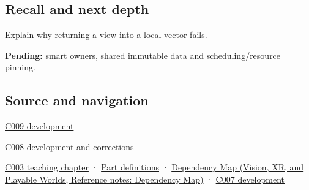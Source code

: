 \subsection{Recall and next depth}\label{appendix-d52e4486f527-recall-and-next-depth}

\hypertarget{appendix-d52e4486f527-recall-and-next-depth}{}

Explain why returning a view into a local vector fails.

\textbf{Pending:} smart owners, shared immutable data and scheduling/resource pinning.

\subsection{Source and navigation}\label{appendix-d52e4486f527-source-and-navigation}

\hypertarget{appendix-d52e4486f527-source-and-navigation}{}

\hyperref[appendix-fd090d982a15-m009---parts-127-147]{C009 development}

\hyperref[appendix-fd090d982a15-m008---parts-113-126]{C008 development and corrections}

\hyperref[01-foundations-i-ch002-where-the-bytes-live]{C003 teaching chapter} · \hyperref[appendix-fd090d982a15-m003---parts-41-60]{Part definitions} · \href{../07-Vision-XR-and-Playable-Worlds/main.pdf\#nameddest=appendix-4ad47bdd269a}{Dependency Map (Vision, XR, and Playable Worlds, Reference notes: Dependency Map)} · \hyperref[01-foundations-i-ch003-bringing-the-object-model-back-to-bytes]{C007 development}
